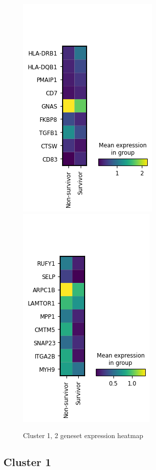 \documentclass[
  12pt,
]{article}
\begin{document}
\begin{figure}

{\centering \includegraphics[width=0.49\linewidth]{../figures/geneset/totalcell_cluster1_genes_selected} \includegraphics[width=0.49\linewidth]{../figures/geneset/totalcell_cluster2_genes_selected} 

}

\caption{Cluster 1, 2 geneset expression heatmap}\label{fig:clsuter1-geneset-expression-heatmap}
\end{figure}

\hypertarget{cluster-1}{%
\subsection{Cluster 1}\label{cluster-1}}
\end{document}

